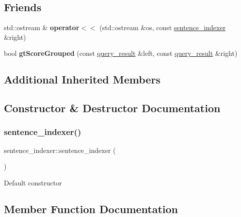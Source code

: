 \subsection*{Friends}
\begin{DoxyCompactItemize}
\item 
\mbox{\label{classsentence__indexer_ad09f6baaa740dac6056316377c95dfa7}} 
std\+::ostream \& {\bfseries operator$<$$<$} (std\+::ostream \&os, const \hyperlink{classsentence__indexer}{sentence\+\_\+indexer} \&right)
\item 
\mbox{\label{classsentence__indexer_a105a138776c9677f92568db3f53d91f2}} 
bool {\bfseries gt\+Score\+Grouped} (const \hyperlink{classquery__result}{query\+\_\+result} \&left, const \hyperlink{classquery__result}{query\+\_\+result} \&right)
\end{DoxyCompactItemize}
\subsection*{Additional Inherited Members}


\subsection{Constructor \& Destructor Documentation}
\mbox{\label{classsentence__indexer_a365d5a760a116eb4f48fe8fdbdeb0421}} 
\subsubsection{\texorpdfstring{sentence\+\_\+indexer()}{sentence\_indexer()}}
{\footnotesize\ttfamily sentence\+\_\+indexer\+::sentence\+\_\+indexer (\begin{DoxyParamCaption}{ }\end{DoxyParamCaption})}

Default constructor 

\subsection{Member Function Documentation}
\mbox{\label{classsentence__indexer_af2e0c3b623e5180ab8684e426962c531}} 
